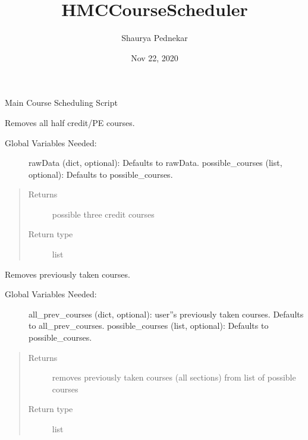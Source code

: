 \documentclass[letterpaper,10pt,english]{sphinxmanual}
\title{HMC\sphinxhyphen{}CourseScheduler}
\date{Nov 22, 2020}
\author{Shaurya Pednekar}
\begin{document}
\pagestyle{empty}
\sphinxmaketitle
\pagestyle{plain}
\sphinxtableofcontents
\pagestyle{normal}
\label{\detokenize{index::doc}}

Main Course Scheduling Script

\begin{fulllineitems}
\label{\detokenize{index:optimizer.only_keep_three_credit_classes}}
Removes all half credit/PE courses.
\begin{description}
\item[{Global Variables Needed:}] \leavevmode
rawData (dict, optional): Defaults to rawData.
possible\_courses (list, optional): Defaults to possible\_courses.

\end{description}
\begin{quote}\begin{description}
\item[{Returns}] \leavevmode
possible three credit courses

\item[{Return type}] \leavevmode
list

\end{description}\end{quote}

\end{fulllineitems}


\begin{fulllineitems}
\label{\detokenize{index:optimizer.remove_prev_courses}}
Removes previously taken courses.
\begin{description}
\item[{Global Variables Needed:}] \leavevmode
all\_prev\_courses (dict, optional): user”s previously taken courses.
Defaults to all\_prev\_courses.
possible\_courses (list, optional): Defaults to possible\_courses.

\end{description}
\begin{quote}\begin{description}
\item[{Returns}] \leavevmode
removes previously taken courses (all sections) from list of
possible courses

\item[{Return type}] \leavevmode
list

\end{description}\end{quote}

\end{fulllineitems}
\end{document}
